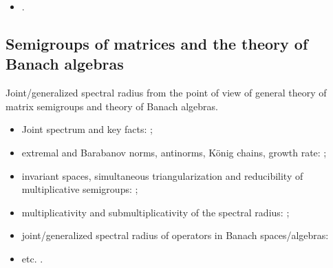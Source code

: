 \begin{itemize}

\item \cite{Ahmadi08, AhmPar:CDC05, AndoShih:SIAM:98, AKKK:92:e, BerWang:LAA92, BE:EJLA97, BeynEls96, BrayTong:TCS79, BrayTong:TCS80, BEN:ETNA94, BTV:MTNS02, BZ:AMPA18, ChM:LAA69, CiconePhD11, Cohen:MPCPS79, DaubLag:LAA92, DaubLag:LAA01, EF:LAA97, FLS:ETDS19, GugZen:LAA01, GurRod:SIAMJMAA97, GugZen:LAA03, Hajnal:MPCPS76, Hartfiel02, Holtz:EJLA00, HR:APM12, JGC:SIAMJMAA14, KasBh:2000, Koz:AiT90:10:e, Koz:DDNS18, Koz:ArXiv20, Mate:PAMS98, Mate:FM99, Mojskerc:LAA14, NeuSch:ArXiv98, NSch:LAA99, PJ:LAA13, Shen:LAA00, Shih:LAA99, ShihPang:AJIFAC08, ShihWP:LAA97, SBKK:CDC97, SBKK:LAA98, SU:SIAMJMAA94, Szyld:TU98, Thomas:Arxiv18, Vlad:ArXiv16, WangCheng:LMA16}.
\end{itemize}

\subsection*{Semigroups of matrices and the theory of Banach algebras}
Joint/generalized spectral radius from the point of view of general theory of matrix semigroups and theory of Banach algebras.

\begin{itemize}

\item Joint spectrum and key facts: \cite{Bell:LAA05, BerWang:LAA92, BreSert:LMS21, EE:PAMS04, GurRod:SIAMJMAA97, Lur:LAA06-2, RS:PAMS95, Sert:CRMASP17};
\item extremal and Barabanov norms, antinorms, K\"{o}nig chains, growth rate: \cite{BCH:SF16, Dai:JMAA11, GugProt:FCM13, GugZen:JMAA15, GugZen:LAA20, GLP:FCM15, GLP:FCM15, Jachymski:TAMS09, LS:LAA02, MejProt:ArXiv21-2, Prot:ArXiv21, Prot:ArXiv21-2, Shih:LAA01};
\item invariant spaces, simultaneous triangularization and reducibility of multiplicative semigroups: \cite{Drnov:97, Drnovsek:SM97, Drn:IEOT01, GPRSTT:P10, Guinand:PAMS82, HNRRR:HJM91, LMMR:JOT98, OmRadj:LAA97, Prot:FPM96:e, Radj:IUMJ90, RRS:PAMS00, Szep:AMH86};
\item multiplicativity and submultiplicativity of the spectral radius: \cite{LR:CJM95, OmRadj:LAA97, ProtVoy:LAA17};
\item joint/generalized spectral radius of operators in Banach spaces/algebras: \cite{BD:ArXiv18, BF:ArXiv18, EE:PAMS04, KisShulTur:20, Morris:JFA12, Muller:APM97, Pep:LMA11, Peperko:LAA12, RS:PAMS95, ShulTur:ArXiv12, ShulTur:JFA00, ShulTur:SM02, Turovskii:JFA99, TurShul:FAP00, TurShul:FAP12}
\item etc. \cite{Javaheri:JMAA13, ManSim:TCS78}.
\end{itemize}

